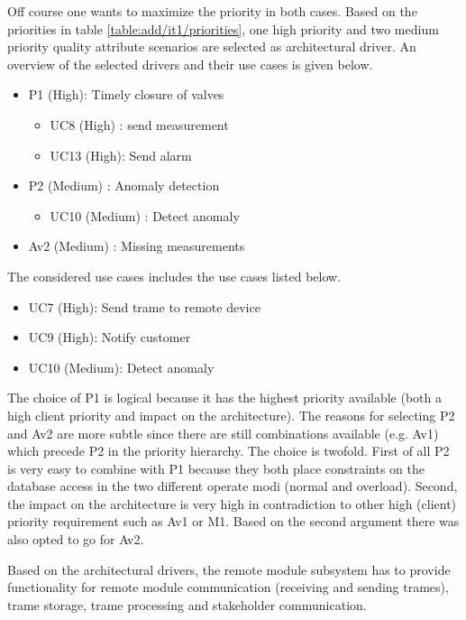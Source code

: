 \npar Off course one wants to maximize the priority in both cases. Based on the
priorities in table \ref{table:add/it1/priorities}, one high priority and two
medium priority quality attribute scenarios are selected as architectural driver. An
overview of the selected drivers and their use cases is given below.

\begin{itemize}
  	\item P1 (High): Timely closure of valves
  	\begin{itemize}
  	  	\item UC8 (High) : send measurement
  		\item UC13 (High): Send alarm 
  	\end{itemize}
  	\item P2 (Medium) : Anomaly detection
  	\begin{itemize}
  	  \item UC10 (Medium) : Detect anomaly %
  	\end{itemize} 
  	\item Av2 (Medium) : Missing measurements %
\end{itemize}

\npar The considered use cases includes the use cases listed below. 

\begin{itemize}
	\item UC7 (High): Send trame to remote device
	\item UC9 (High): Notify customer
	\item UC10 (Medium): Detect anomaly
\end{itemize}

\npar The choice of P1 is logical because it has the highest priority available
(both a high client priority and impact on the architecture). The reasons for
selecting P2 and Av2 are more subtle since there are still combinations
available (e.g. Av1) which precede P2 in the priority hierarchy. The choice is
twofold. First of all P2 is very easy to combine with P1 because they both place
constraints on the database access in the two different operate modi (normal and
overload). Second, the impact on the architecture is very high in contradiction
to other high (client) priority requirement such as Av1 or M1. Based on the
second argument there was also opted to go for Av2.

\npar Based on the architectural drivers, the remote module subsystem has to
provide functionality for remote module communication (receiving and sending
trames), trame storage, trame processing and stakeholder communication. 

